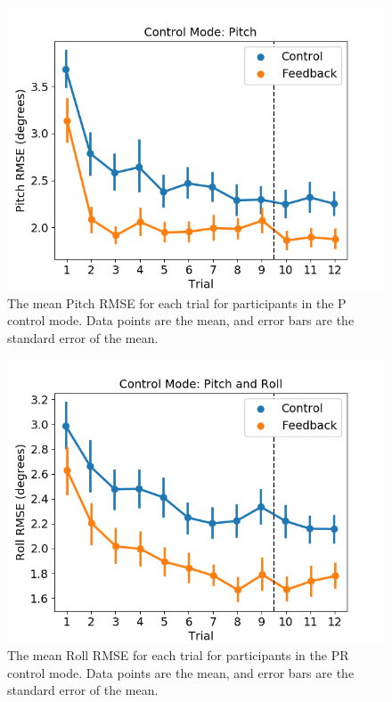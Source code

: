 \begin{figure}[b!]
    \begin{center}
        \includegraphics[width=0.8\linewidth]{figures/Aircraft/image3.png}
        \caption[The mean Pitch RMSE for each trial]{The mean Pitch RMSE for each trial for participants in the P control mode. Data points are the mean, and error bars are the standard error of the mean.}
        \label{figure-hfes:pitchrmse}
    \end{center}
\end{figure}
\begin{figure}[b!]
    \begin{center}
        \includegraphics[width=0.8\linewidth]{figures/Aircraft/image4.png}
        \caption[The mean Roll RMSE for each trial]{The mean Roll RMSE for each trial for participants in the PR control mode. Data points are the mean, and error bars are the standard error of the mean.}
        \label{figure-hfes:rollrmse}
    \end{center}
\end{figure}
